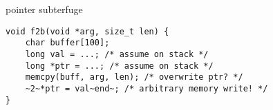 \usetikzlibrary{calc}
\begin{frame}[fragile,label=pointerSub]{pointer subterfuge}
\begin{lstlisting}
void f2b(void *arg, size_t len) {
    char buffer[100];
    long val = ...; /* assume on stack */
    long *ptr = ...; /* assume on stack */
    memcpy(buff, arg, len); /* overwrite ptr? */
    ~2~*ptr = val~end~; /* arbitrary memory write! */
}
\end{lstlisting}
\end{frame}



